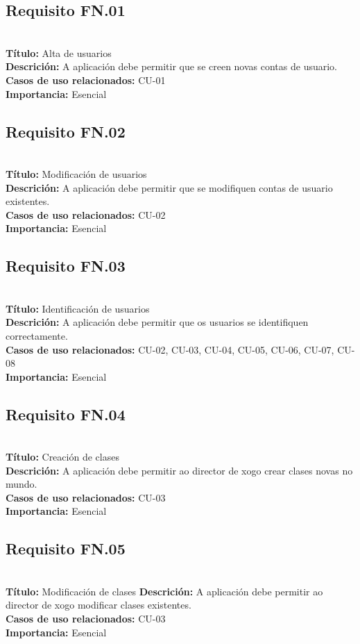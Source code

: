 \subsection{Requisito FN.01}~\\
{\bf Título:} Alta de usuarios\\
{\bf Descrición:} A aplicación debe permitir que se creen novas contas de usuario.\\
{\bf Casos de uso relacionados:} CU-01\\
{\bf Importancia:} Esencial

\subsection{Requisito FN.02}~\\
{\bf Título:} Modificación de usuarios\\
{\bf Descrición:} A aplicación debe permitir que se modifiquen contas de usuario
existentes.\\
{\bf Casos de uso relacionados:} CU-02\\
{\bf Importancia:} Esencial

\subsection{Requisito FN.03}~\\
{\bf Título:} Identificación de usuarios\\
{\bf Descrición:} A aplicación debe permitir que os usuarios se identifiquen
correctamente.\\
{\bf Casos de uso relacionados:} CU-02, CU-03, CU-04, CU-05, CU-06, CU-07, CU-08\\
{\bf Importancia:} Esencial

\subsection{Requisito FN.04}~\\
{\bf Título:} Creación de clases\\
{\bf Descrición:} A aplicación debe permitir ao director de xogo crear clases
novas no mundo.\\
{\bf Casos de uso relacionados:} CU-03\\
{\bf Importancia:} Esencial

\subsection{Requisito FN.05}~\\
{\bf Título:} Modificación de clases
{\bf Descrición:} A aplicación debe permitir ao director de xogo modificar
clases existentes.\\
{\bf Casos de uso relacionados:} CU-03\\
{\bf Importancia:} Esencial

